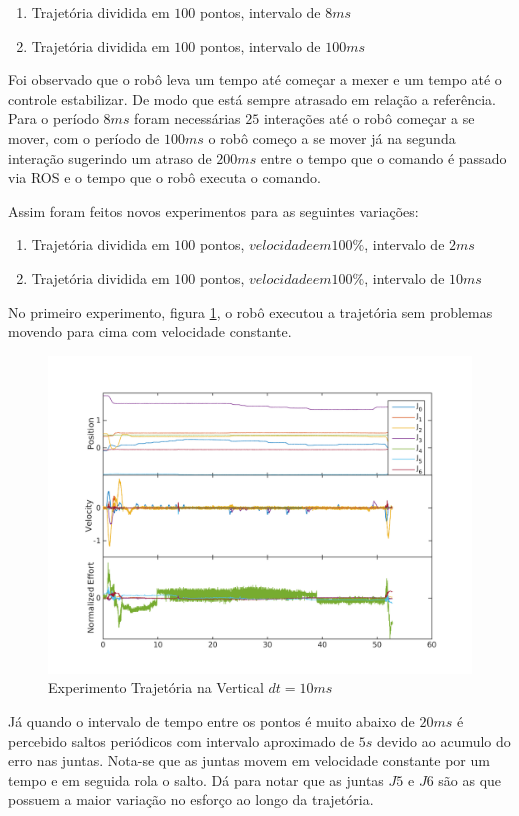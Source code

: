 \begin{enumerate}
    \item Trajetória dividida em $100$ pontos, intervalo de $8 ms$
    \item Trajetória dividida em $100$ pontos, intervalo de $100 ms$
\end{enumerate}

Foi observado que o robô leva um tempo até começar a mexer e um tempo até o controle estabilizar. De modo que está sempre atrasado em relação a referência. Para o período $8 ms$ foram necessárias $25$ interações até o robô começar a se mover, com o período de $100 ms$ o robô começo a se mover já na segunda interação sugerindo um atraso de $200 ms$ entre o tempo que o comando é passado via ROS e o tempo que o robô executa o comando.


Assim foram feitos novos experimentos para as seguintes variações:

\begin{enumerate}
    \item Trajetória dividida em $100$ pontos, $velocidade em 100\%$, intervalo de $2 ms$
    \item Trajetória dividida em $100$ pontos, $velocidade em 100\%$, intervalo de $10 ms$
\end{enumerate}

No primeiro experimento, figura \ref{fig:moveUp1}, o robô executou a trajetória sem problemas movendo para cima com velocidade constante.

\begin{figure}[H]
    \centering
    \includegraphics[width=0.6\linewidth,trim={2cm 1cm 2cm 2cm}]{tex/figs/moveUp1stateEvalv70s10.png}
    \caption{Experimento Trajetória na Vertical $dt=10ms$ }
    \label{fig:moveUp1}
\end{figure}

Já quando o intervalo de tempo entre os pontos é muito abaixo de $20ms$ é percebido saltos periódicos com intervalo aproximado de $5s$ devido ao acumulo do erro nas juntas. Nota-se que as juntas movem em velocidade constante por um tempo e em seguida rola o salto. Dá para notar que as juntas $J5$ e $J6$ são as que possuem a maior variação no esforço ao longo da trajetória.

